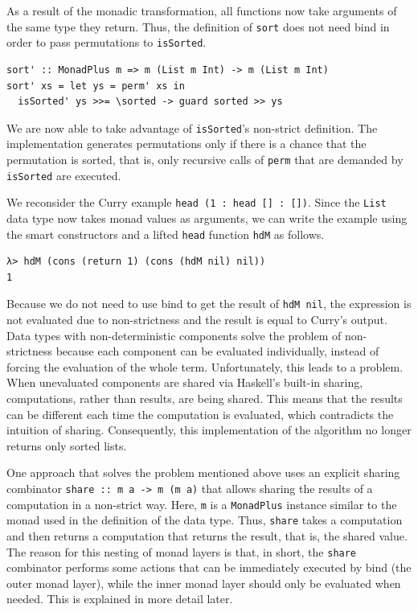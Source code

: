 \documentclass[a4paper, 11pt, fleqn, twoside, abstract=on]{scrreprt}
\newcommand{\hinl}[1]{\texttt{#1}}
\newcommand{\cinl}[1]{\texttt{#1}}
\begin{document}
As a result of the monadic transformation, all functions now take arguments of the same type they return.
Thus, the definition of \hinl{sort} does not need bind in order to pass permutations to \hinl{isSorted}.

\begin{verbatim}
sort' :: MonadPlus m => m (List m Int) -> m (List m Int)
sort' xs = let ys = perm' xs in
  isSorted' ys >>= \sorted -> guard sorted >> ys
\end{verbatim}

We are now able to take advantage of \hinl{isSorted}'s non-strict definition.
The implementation generates permutations only if there is a chance that the permutation is sorted, that is, only recursive calls of \hinl{perm} that are demanded by \hinl{isSorted} are executed.

We reconsider the Curry example \hinl{head (1 : head [] : [])}.
Since the \hinl{List} data type now takes monad values as arguments, we can write the example using the smart constructors and a lifted \hinl{head} function \cinl{hdM} as follows.

\begin{verbatim}
λ> hdM (cons (return 1) (cons (hdM nil) nil))
1
\end{verbatim}
\noindent
Because we do not need to use bind to get the result of \hinl{hdM nil}, the expression is not evaluated due to non-strictness and the result is equal to Curry's output.
Data types with non-deterministic components solve the problem of non-strictness because each component can be evaluated individually, instead of forcing the evaluation of the whole term.
Unfortunately, this leads to a problem.
\label{sec:sharingComputations}
When unevaluated components are shared via Haskell's built-in sharing, computations, rather than results, are being shared.
This means that the results can be different each time the computation is evaluated, which contradicts the intuition of sharing.
Consequently, this implementation of the algorithm no longer returns only sorted lists.

One approach that solves the problem mentioned above uses an explicit sharing combinator \hinl{share :: m a -> m (m a)} that allows sharing the results of a computation in a non-strict way.
Here, \hinl{m} is a \hinl{MonadPlus} instance similar to the monad used in the definition of the data type.
Thus, \hinl{share} takes a  computation and then returns a computation that returns the result, that is, the shared value.
The reason for this nesting of monad layers is that, in short, the \hinl{share} combinator performs some actions that can be immediately executed by bind (the outer monad layer), while the inner monad layer should only be evaluated when needed.
This is explained in more detail later.
\end{document}
